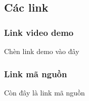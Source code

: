 \subsection{Các link}
\subsubsection{Link video demo}
Chèn link demo vào đây
\subsubsection{Link mã nguồn}
Còn đây là link mã nguồn